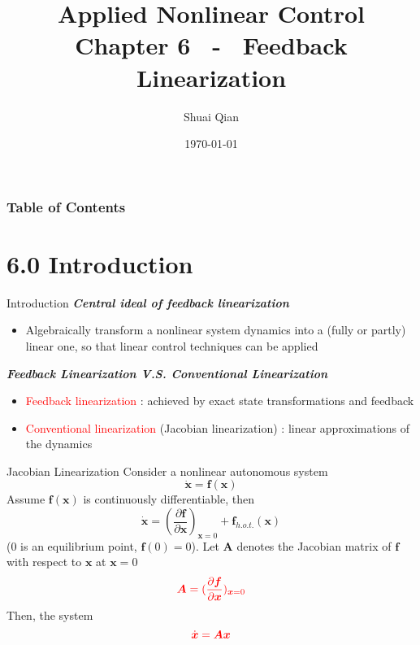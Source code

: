 \documentclass{beamer}
\title{Applied Nonlinear Control \\
        \large Chapter 6 ~-~ Feedback Linearization}
\author{\large Shuai Qian}
\date{\today}
\institute{School of Automation \\
        Nanjing University of Science and Technology}
\renewcommand{\vec}[1]{\ensuremath{\boldsymbol{#1}}} %
\begin{document}
  \maketitle

  \begin{frame}
  \addtocounter{framenumber}{-2}
  \frametitle{Table of Contents}
  \thispagestyle{empty}
  \tableofcontents
  \end{frame}

  \section{6.0  Introduction}

  \begin{frame}{Introduction}
    \textbf{\textit{Central ideal of feedback linearization}}
    \begin{itemize}
      \item {\color{red}Algebraically} transform a nonlinear system dynamics into a (fully or partly) linear one, so that linear control techniques can be applied
    \end{itemize}

    \textbf{\textit{Feedback Linearization V.S. Conventional Linearization}}
    \begin{itemize}
      \item \textcolor{red}{Feedback linearization} : achieved by exact state transformations and feedback
      \item \textcolor{red}{Conventional linearization} (Jacobian linearization) : linear approximations of the dynamics
    \end{itemize}
   \end{frame}


   \begin{frame}{Jacobian Linearization}
    Consider a nonlinear autonomous system
    \begin{equation}\label{nonlinear}
      \dot{\vec{x}} = \vec{f(x)}
    \end{equation}
    Assume $\vec{f(x)}$ is continuously differentiable, then
    $$
    \dot{\vec{x}} = (\frac{\partial \vec{f}}{\partial \vec{x}})_{\vec{x}=0} + \vec{f}_{h.o.t.}(\vec{x})
    $$
    (0 is an equilibrium point, $\vec{f}(0) = 0$).
    Let $\vec{A}$ denotes the Jacobian matrix of $\vec{f}$ with respect to $\vec{x}$ at $\vec{x}=0$
    $$
    {\color{red}\vec{A} = (\frac{\partial \vec{f}}{\partial \vec{x}})_{\vec{x}=0}}
    $$
    Then, the system
    $$
    {\color{red}\dot{\vec{x}} = \vec{Ax}}
    $$
   \end{frame}
\end{document}
